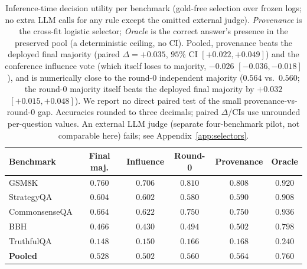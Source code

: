 \begin{table}[t]
\centering\small
\caption{Inference-time decision utility per benchmark (gold-free selection over frozen logs; no extra LLM
calls for any rule except the omitted external judge). \emph{Provenance} is the cross-fit logistic selector;
\emph{Oracle} is the correct answer's presence in the preserved pool (a deterministic ceiling, no CI).
Pooled, provenance beats the deployed final majority (paired $\Delta=+0.035$, $95\%$ CI $[+0.022,+0.049]$)
and the conference influence vote (which itself loses to majority, $-0.026$ $[-0.036,-0.018]$), and is
numerically close to the round-$0$ independent majority ($0.564$ vs.\ $0.560$; the round-$0$ majority itself
beats the deployed final majority by $+0.032$ $[+0.015,+0.048]$). We report no direct paired test of the
small provenance-vs-round-$0$ gap. Accuracies rounded to three
decimals; paired $\Delta$/CIs use unrounded per-question values. An external LLM judge (separate
four-benchmark pilot, not comparable here) fails; see Appendix~\ref{app:selectors}.}
\label{tab:selector}
\begin{tabular}{lccccc}
\toprule
Benchmark & Final maj. & Influence & Round-0 & Provenance & Oracle \\
\midrule
GSM8K         & $0.760$ & $0.706$ & $0.810$ & $0.808$ & $0.920$ \\
StrategyQA    & $0.604$ & $0.602$ & $0.580$ & $0.590$ & $0.908$ \\
CommonsenseQA & $0.664$ & $0.622$ & $0.750$ & $0.750$ & $0.936$ \\
BBH           & $0.466$ & $0.430$ & $0.494$ & $0.502$ & $0.798$ \\
TruthfulQA    & $0.148$ & $0.150$ & $0.166$ & $0.168$ & $0.240$ \\
\midrule
\textbf{Pooled} & $\mathbf{0.528}$ & $0.502$ & $0.560$ & $\mathbf{0.564}$ & $0.760$ \\
\bottomrule
\end{tabular}
\end{table}

